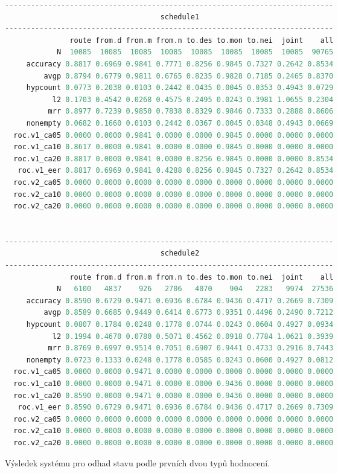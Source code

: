 {
\footnotesize
\begin{example}
\begin{lstlisting}[language=c,frame=none]
----------------------------------------------------------------------------
                                    schedule1
----------------------------------------------------------------------------
               route from.d from.m from.n to.des to.mon to.nei  joint    all
            N  10085  10085  10085  10085  10085  10085  10085  10085  90765
     accuracy 0.8817 0.6969 0.9841 0.7771 0.8256 0.9845 0.7327 0.2642 0.8534
         avgp 0.8794 0.6779 0.9811 0.6765 0.8235 0.9828 0.7185 0.2465 0.8370
     hypcount 0.0773 0.2038 0.0103 0.2442 0.0435 0.0045 0.0353 0.4943 0.0729
           l2 0.1703 0.4542 0.0268 0.4575 0.2495 0.0243 0.3981 1.0655 0.2304
          mrr 0.8977 0.7239 0.9850 0.7838 0.8329 0.9846 0.7333 0.2888 0.8606
     nonempty 0.0682 0.1660 0.0103 0.2442 0.0367 0.0045 0.0348 0.4943 0.0669
  roc.v1_ca05 0.0000 0.0000 0.9841 0.0000 0.0000 0.9845 0.0000 0.0000 0.0000
  roc.v1_ca10 0.8617 0.0000 0.9841 0.0000 0.0000 0.9845 0.0000 0.0000 0.0000
  roc.v1_ca20 0.8817 0.0000 0.9841 0.0000 0.8256 0.9845 0.0000 0.0000 0.8534
   roc.v1_eer 0.8817 0.6969 0.9841 0.4288 0.8256 0.9845 0.7327 0.2642 0.8534
  roc.v2_ca05 0.0000 0.0000 0.0000 0.0000 0.0000 0.0000 0.0000 0.0000 0.0000
  roc.v2_ca10 0.0000 0.0000 0.0000 0.0000 0.0000 0.0000 0.0000 0.0000 0.0000
  roc.v2_ca20 0.0000 0.0000 0.0000 0.0000 0.0000 0.0000 0.0000 0.0000 0.0000


----------------------------------------------------------------------------
                                    schedule2
----------------------------------------------------------------------------
               route from.d from.m from.n to.des to.mon to.nei  joint    all
            N   6100   4837    926   2706   4070    904   2283   9974  27536
     accuracy 0.8590 0.6729 0.9471 0.6936 0.6784 0.9436 0.4717 0.2669 0.7309
         avgp 0.8589 0.6685 0.9449 0.6414 0.6773 0.9351 0.4496 0.2490 0.7212
     hypcount 0.0807 0.1784 0.0248 0.1778 0.0744 0.0243 0.0604 0.4927 0.0934
           l2 0.1994 0.4670 0.0780 0.5071 0.4562 0.0918 0.7784 1.0621 0.3939
          mrr 0.8769 0.6997 0.9514 0.7051 0.6907 0.9441 0.4733 0.2916 0.7443
     nonempty 0.0723 0.1333 0.0248 0.1778 0.0585 0.0243 0.0600 0.4927 0.0812
  roc.v1_ca05 0.0000 0.0000 0.9471 0.0000 0.0000 0.0000 0.0000 0.0000 0.0000
  roc.v1_ca10 0.0000 0.0000 0.9471 0.0000 0.0000 0.9436 0.0000 0.0000 0.0000
  roc.v1_ca20 0.8590 0.0000 0.9471 0.0000 0.0000 0.9436 0.0000 0.0000 0.0000
   roc.v1_eer 0.8590 0.6729 0.9471 0.6936 0.6784 0.9436 0.4717 0.2669 0.7309
  roc.v2_ca05 0.0000 0.0000 0.0000 0.0000 0.0000 0.0000 0.0000 0.0000 0.0000
  roc.v2_ca10 0.0000 0.0000 0.0000 0.0000 0.0000 0.0000 0.0000 0.0000 0.0000
  roc.v2_ca20 0.0000 0.0000 0.0000 0.0000 0.0000 0.0000 0.0000 0.0000 0.0000
\end{lstlisting}
\caption{Výsledek systému pro odhad stavu podle prvních dvou typů hodnocení.}
\label{ex:res1}
\end{example}

}
